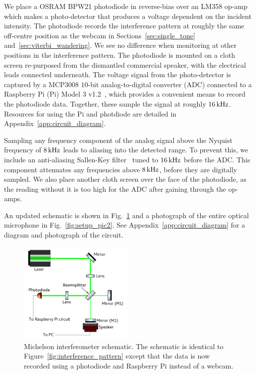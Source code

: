 \documentclass[paper-main.tex]{subfiles}
\begin{document}
We place a OSRAM BPW21 photodiode in reverse-bias over an LM358 op-amp which makes a photo-detector that produces a voltage dependent on the incident intensity. 
The photodiode records the interference pattern at roughly the same off-centre position as the webcam in Sections~\ref{sec:single_tone} and~\ref{sec:viterbi_wandering}.
We see no difference when monitoring at other positions in the interference pattern.
The photodiode is mounted on a cloth screen re-purposed from the dismantled commercial speaker, with the electrical leads connected underneath. 
The voltage signal from the photo-detector is captured by a MCP3008 $10$-bit analog-to-digital converter (ADC) connected to a Raspberry Pi (Pi) Model 3 v1.2~\cite{RaspberryPi:online}, which provides a convenient means to record the photodiode data.
Together, these sample the signal at roughly $16\,{\rm kHz}$. 
Resources for using the Pi and photdiode are detailed in Appendix~\ref{app:circuit_diagram}.


Sampling any frequency component of the analog signal above the Nyquist frequency of $8\,{\rm kHz}$ leads to aliasing into the detected range. 
To prevent this, we include an anti-aliasing Sallen-Key filter~\cite{sallen_key_filter} tuned to $16\,{\rm kHz}$ before the ADC. 
This component attenuates any frequencies above $8\,{\rm kHz}$, before they are digitally sampled.
We also place another cloth screen over the face of the photodiode, as the reading without it is too high for the ADC after gaining through the op-amps. 

An updated schematic is shown in Fig.~\ref{fig:ifo_schematic_podo} and a photograph of the entire optical microphone in Fig.~\ref{fig:setup_pic2}.
See Appendix~\ref{app:circuit_diagram} for a diagram and photograph of the circuit. 


\begin{figure}
	\includegraphics[width=0.49\textwidth]{figures/ifo_schematic_photodiode_edit.pdf}
	\caption{
Michelson interferometer schematic. 
The schematic is identical to Figure~\ref{fig:interference_pattern} except that the data is now recorded using a photodiode and Raspberry Pi instead of a webcam. 
}
	\label{fig:ifo_schematic_podo}
\end{figure}
\end{document}
